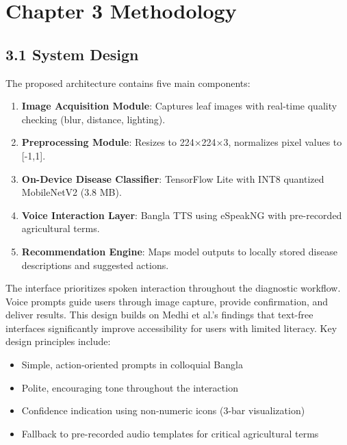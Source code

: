 \documentclass[12pt,letterpaper]{report}
\begin{document}
\chapter*{Chapter 3 Methodology}

\section*{3.1 System Design}

The proposed architecture contains five main components:
\begin{enumerate}
    \item \textbf{Image Acquisition Module}: Captures leaf images with real-time quality checking (blur, distance, lighting).
    \item \textbf{Preprocessing Module}: Resizes to 224×224×3, normalizes pixel values to [-1,1].
    \item \textbf{On-Device Disease Classifier}: TensorFlow Lite with INT8 quantized MobileNetV2 (3.8 MB).
    \item \textbf{Voice Interaction Layer}: Bangla TTS using eSpeakNG with pre-recorded agricultural terms.
    \item \textbf{Recommendation Engine}: Maps model outputs to locally stored disease descriptions and suggested actions.
\end{enumerate}

The interface prioritizes spoken interaction throughout the diagnostic workflow. Voice prompts guide users through image capture, provide confirmation, and deliver results. This design builds on Medhi et al.'s \cite{ref7} findings that text-free interfaces significantly improve accessibility for users with limited literacy. Key design principles include:

\begin{itemize}
\item Simple, action-oriented prompts in colloquial Bangla
\item Polite, encouraging tone throughout the interaction
\item Confidence indication using non-numeric icons (3-bar visualization)
\item Fallback to pre-recorded audio templates for critical agricultural terms
\end{itemize}
\end{document}
